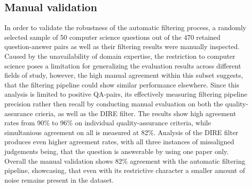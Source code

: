 \subsection{Manual validation}
In order to validate the robustness of the automatic filtering process, a randomly selected sample of 50 computer science questions out of the 470 retained question-answer pairs as well as their filtering results were manually inspected. Caused by the unavailability of domain expertise, the restriction to computer science poses a limitation for generalizing the evaluation results across different fields of study, however, the high manual agreement within this subset suggests, that the filtering pipeline could show similar performance elsewhere.
Since this analysis is limited to positive QA-pairs, its effectively measuring filtering pipeline precision rather then recall by conducting manual evaluation on both the quality-assurance crieria, as well as the DIRE filter. The results show high agreement rates from 90\% to 96\% on individual quality-assurance criteria, while simultanious agreement on all is measured at 82\%.
Analysis of the DIRE filter produces even higher agreement rates, with all three instances of missaligned judgements being, that the question is answerable by using one paper only.
Overall the manual validation shows 82\% agreement with the automatic filtering pipeline, showcasing, that even with its restrictive character a smaller amount of noise remains present in the dataset.
